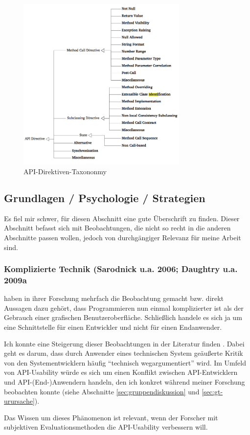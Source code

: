 \begin{figure}[!ht]
  \centering
    \includegraphics[width=0.75\textwidth]{Figures/APIDirectiveTaxonomy.png}
  \caption{API-Direktiven-Taxononmy \citep{Monperrus:2011bf}}
  \label{fig:APIDirectiveTaxonomy}
\end{figure}





\subsection{Grundlagen / Psychologie / Strategien}

Es fiel mir schwer, für diesen Abschnitt eine gute Überschrift zu finden. Dieser Abschnitt befasst sich mit Beobachtungen, die nicht so recht in die anderen Abschnitte passen wollen, jedoch von durchgängiger Relevanz für meine Arbeit sind.

\subsubsection{Komplizierte Technik (Sarodnick u.a. 2006; Daughtry u.a. 2009a}
\begin{important}
\cite{Daughtry:2009be} haben in ihrer Forschung mehrfach die Beobachtung gemacht bzw. direkt Aussagen dazu gehört, dass Programmieren nun einmal komplizierter ist als der Gebrauch einer grafischen Benutzeroberfläche. Schließlich handele es sich ja um eine Schnittstelle für einen Entwickler und nicht für einen Endanwender.

Ich konnte eine Steigerung dieser Beobachtungen in der Literatur finden \citep{Sarodnick:2006vc}. Dabei geht es darum, dass durch Anwender eines technischen System geäußerte Kritik von den Systementwicklern häufig ``technisch wegargumentiert'' wird. Im Umfeld von API-Usability würde es sich um einen Konflikt zwischen API-Entwicklern und API-(End-)Anwendern handeln, den ich konkret während meiner Forschung beobachten konnte (siehe Abschnitte \ref{sec:gruppendiskussion} und \ref{sec:gt-urursache}).

Das Wissen um dieses Phänomenon ist relevant, wenn der Forscher mit subjektiven Evaluationsmethoden die API-Usability verbessern will.
\end{important}

